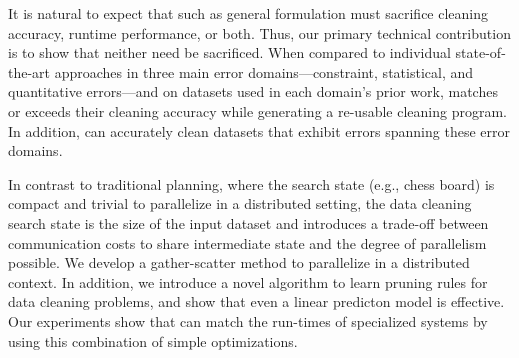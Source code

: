 It is natural to expect that such as general formulation must sacrifice cleaning accuracy, runtime performance, or both.  Thus, our primary technical contribution is to show that neither need be sacrificed.  
When compared to individual state-of-the-art approaches in three main error domains---constraint, statistical, and quantitative errors---and on datasets used in each domain's prior work, \sys matches or exceeds their cleaning accuracy while generating a re-usable cleaning program.  In addition, \sys can accurately clean datasets that exhibit errors spanning these error domains.    



In contrast to traditional planning, where the search state (e.g., chess board) is compact and trivial to parallelize in a distributed setting, the data cleaning search state is the size of the input dataset and introduces a trade-off between communication costs to share intermediate state and the degree of parallelism possible.  We develop a gather-scatter method to parallelize \sys in a distributed context.  In addition, we introduce a novel algorithm to learn pruning rules for data cleaning problems, and show that even a linear predicton model is effective.
Our experiments show that \sys can match the run-times of specialized systems by using this combination of simple optimizations.




